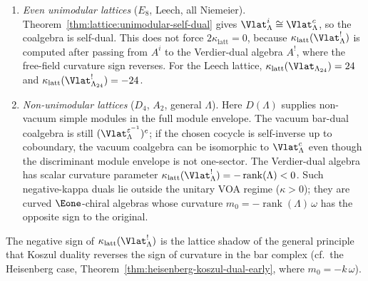\begin{remark}
\begin{enumerate}[label=\textup{(\roman*)}]
$\kappa_{\mathrm{latt}} = 1$. Its Verdier-dual free-field algebra is
$\cH_1^!\simeq(\mathrm{Sym}^{\mathrm{ch}}(V^*[1]),m_0=-\omega)$
with $\kappa_{\mathrm{latt}}(\cH_1^!) = -1$
(Theorem~\ref{thm:heisenberg-koszul-dual-early}).
The Koszul dual is the curved chiral symmetric algebra,
\emph{not} $\cH_{-1}$: these are different algebras
with the same numerical kappa.
\item \emph{Even unimodular lattices} ($E_8$, Leech, all Niemeier).
Theorem~\ref{thm:lattice:unimodular-self-dual} gives
$\Vlat_\Lambda^i \cong \Vlat_\Lambda^c$, so the
coalgebra is self-dual. This does not force
$2\kappa_{\mathrm{latt}}=0$, because
$\kappa_{\mathrm{latt}}(\Vlat_\Lambda^!)$ is computed
after passing from $A^i$ to the Verdier-dual algebra $A^!$, where the
free-field curvature sign reverses. For the Leech lattice,
$\kappa_{\mathrm{latt}}(\Vlat_{\Lambda_{24}}) = 24$
and
$\kappa_{\mathrm{latt}}(\Vlat_{\Lambda_{24}}^!) = -24$.
\item \emph{Non-unimodular lattices} ($D_4$, $A_2$, general $\Lambda$).
Here $D(\Lambda)$ supplies non-vacuum simple modules in the full
module envelope. The vacuum bar-dual coalgebra is still
$(\Vlat_\Lambda^{\varepsilon^{-1}})^c$; if the chosen cocycle is
self-inverse up to coboundary, the vacuum coalgebra can be
isomorphic to $\Vlat_\Lambda^c$ even though the discriminant module
envelope is not one-sector. The Verdier-dual algebra has scalar
curvature parameter
$\kappa_{\mathrm{latt}}(\Vlat_\Lambda^!) =
-\operatorname{rank}(\Lambda) < 0$.
Such negative-kappa duals lie outside the unitary VOA regime
($\kappa > 0$); they are curved $\Eone$-chiral algebras whose curvature
$m_0 = -\operatorname{rank}(\Lambda)\,\omega$
has the opposite sign to the original.
\end{enumerate}
The negative sign of $\kappa_{\mathrm{latt}}(\Vlat_\Lambda^!)$
is the lattice shadow of the general principle that
Koszul duality reverses the sign of curvature in the
bar complex
(cf.\ the Heisenberg case,
Theorem~\ref{thm:heisenberg-koszul-dual-early},
where $m_0 = -k\,\omega$).
\end{remark}

